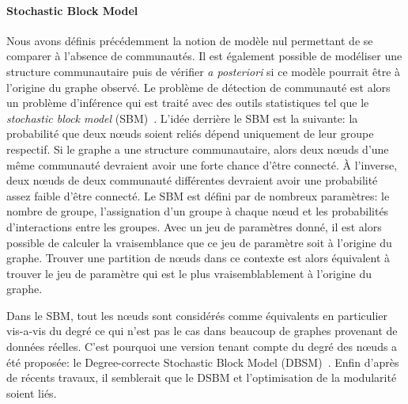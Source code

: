 \paragraph{Stochastic Block Model}
Nous avons définis précédemment la notion de modèle nul permettant de se comparer à l'absence de communautés.
Il est également possible de modéliser une structure communautaire puis de vérifier \emph{a posteriori} si ce modèle pourrait être à l'origine du graphe observé.
Le problème de détection de communauté est alors un problème d'inférence qui est traité avec des outils statistiques tel que le \emph{stochastic block model} (SBM)~\cite{Holland1983a,Nowicki2001}.
L'idée derrière le SBM est la suivante: la probabilité que deux n\oe uds soient reliés dépend uniquement de leur groupe respectif.
Si le graphe a une structure communautaire, alors deux n\oe uds d'une même communauté devraient avoir une forte chance d'être connecté.
\`A l'inverse, deux n\oe uds de deux communauté différentes devraient avoir une probabilité assez faible d'être connecté.
Le SBM est défini par de nombreux paramètres: le nombre de groupe, l'assignation d'un groupe à chaque n\oe ud et les probabilités d'interactions entre les groupes.
Avec un jeu de paramètres donné, il est alors possible de calculer la vraisemblance que ce jeu de paramètre soit à l'origine du graphe.
Trouver une partition de n\oe uds dans ce contexte est alors équivalent à trouver le jeu de paramètre qui est le plus vraisemblablement à l'origine du graphe.

Dans le SBM, tout les n\oe uds sont considérés comme équivalents en particulier vis-a-vis du degré ce qui n'est pas le cas dans beaucoup de graphes provenant de données réelles.
C'est pourquoi une version tenant compte du degré des n\oe uds a été proposée: le Degree-correcte Stochastic Block Model (DBSM)~\cite{Karrer2011}.
Enfin d'après de récents travaux\cite{Newman2016}, il semblerait que le DSBM et l'optimisation de la modularité soient liés.

